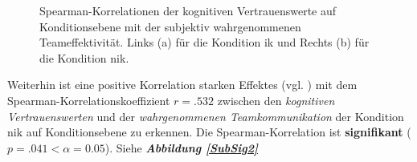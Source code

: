 \documentclass[a4paper,11pt]{article}%
\renewcommand{\\}{\vspace*{0.5\baselineskip} \newline}
\begin{document}
\begin{figure}[h]
  \centering
  \qquad
  \caption[Spearman-Korrelation kog. Vert. NIK und wahrg. Teameffektivität NIK]{Spearman-Korrelationen der kognitiven Vertrauenswerte auf Konditionsebene mit der subjektiv wahrgenommenen Teameffektivität. Links (a) für die Kondition \ac{ik} und Rechts (b) für die Kondition \ac{nik}.}
  \label{SubSig1}
\end{figure}

Weiterhin ist eine positive Korrelation starken Effektes (vgl. \citep{cohen2013statistical}) mit dem Spearman-Korrelationskoeffizient $r = .532$ zwischen den \textit{kognitiven Vertrauenswerten} und der \textit{wahrgenommenen Teamkommunikation} der Kondition \ac{nik} auf Konditionsebene zu erkennen. Die Spearman-Korrelation ist \textbf{signifikant} ($p = .041 < \alpha = 0.05$). Siehe \textbf{\textit{Abbildung \ref{SubSig2}}}\\
\end{document}
